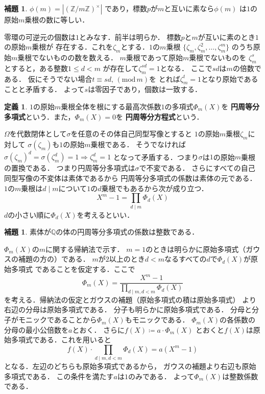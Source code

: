 \documentclass[dvipdfmx,a4paper,12pt]{jsarticle}
\makeatletter
\theoremstyle{definition}
\newtheorem{definition}[theorem]{定義}
\newtheorem{lemma}[theorem]{補題}
\renewcommand{\proofname}{証明}
\renewenvironment{proof}[1][\proofname]{%
  \par\pushQED{\qed}%
  \normalfont \topsep6\p@\@plus6\p@\relax
  \trivlist
  \item[\hskip\labelsep\bfseries#1\@addpunct{.}]\ignorespaces
}{%
  \popQED\endtrivlist\@endpefalse
}
\makeatother
\begin{document}
\begin{lemma}
    $\phi (m)= |(\mathbb{Z}/m\mathbb{Z})^\times|$
    であり，標数$p$が$m$と互いに素なら$\phi (m)$
    は$1$の原始$m$乗根の数に等しい．
\end{lemma}

\begin{proof}
    零環の可逆元の個数は$1$とみなす．前半は明らか．
    標数$p$と$m$が互いに素のとき$1$の原始$m$乗根が
    存在する．これを$\zeta_m$とする．$1$の$m$乗根
    $\{ \zeta_m,\zeta_m^2,\ldots, \zeta_m^m \}$
    のうち原始$m$乗根でないものの数を数える．
    $m$乗根であって原始$m$乗根でないものを
    $\zeta_m^s$とすると，ある整数$1\leq d < m$
    が存在して$\zeta_m^{sd}=1$となる．
    ここで$sd$は$m$の倍数である．
    仮にそうでない場合$t\equiv sd,\, (\text{mod}\, m)$を
    とれば$\zeta_m^t=1$となり原始であることと矛盾する．
    よって$s$は零因子であり，個数は一致する．
\end{proof}

\begin{definition}
    $1$の原始$m$乗根全体を根にする最高次係数$1$の多項式$\Phi_m(X)$を
    \textbf{円周等分多項式}という．また，$\Phi_m(X)=0$を
    \textbf{円周等分方程式}という．
\end{definition}

$\Omega$を代数閉体として$\sigma$を任意のその体自己同型写像とすると
$1$の原始$m$乗根$\zeta_m$に対して
$\sigma (\zeta_m)$も$1$の原始$m$乗根である．
そうでなければ$\sigma (\zeta_m)^d=\sigma(\zeta_m^d)=1\Rightarrow\zeta_m^d=1$
となって矛盾する．つまり$\sigma$は$1$の原始$m$乗根の置換である．
つまり円周等分多項式は$\sigma$で不変である．
さらにすべての自己同型写像の不変体は素体であるから
円周等分多項式の係数は素体の元である．
$1$の$m$乗根は$d\mid m$について$1$の$d$乗根でもあるから次が成り立つ．
\[ X^m-1=\prod_{d\mid m}\Phi_d(X)\]
$d$の小さい順に$\Phi_d(X)$を考えるといい．
\begin{lemma}\label{lemma:ensyu toubun takousiki keisuu seisuu}
    素体が$\mathbb{Q}$の体の円周等分多項式の係数は整数である．
\end{lemma}

\begin{proof}
    $\Phi_m(X)$の$m$に関する帰納法で示す．
    $m=1$のときは明らかに原始多項式（ガウスの補題の方の）である．
    $m$が$2$以上のとき$d<m$なるすべての$d$で$\Phi_d(X)$が原始多項式
    であることを仮定する．ここで
    \[
    \Phi_m(X)=\frac{X^m-1}{\prod_{d\mid m,d<m}\Phi_d(X)}
    \]
    を考える．帰納法の仮定とガウスの補題（原始多項式の積は原始多項式）
    より右辺の分母は原始多項式である．
    分子も明らかに原始多項式である．
    分母と分子がモニックであることから$\Phi_m(X)$もモニックである．
    $\Phi_m(X)$の各係数の分母の最小公倍数を$a$とおく．
    さらに$\displaystyle f(X)\coloneqq a\cdot\Phi_m(X)$
    とおくと$f(X)$は原始多項式である．これを用いると
    \[
    f(X)\cdot \prod_{d\mid m,d<m}\Phi_d(X)=a(X^m-1)
    \]
    となる．左辺のどちらも原始多項式であるから，
    ガウスの補題より右辺も原始多項式である．
    この条件を満たす$a$は$1$のみである．
    よって$\Phi_m(X)$は整数係数である．
\end{proof}
\end{document}
